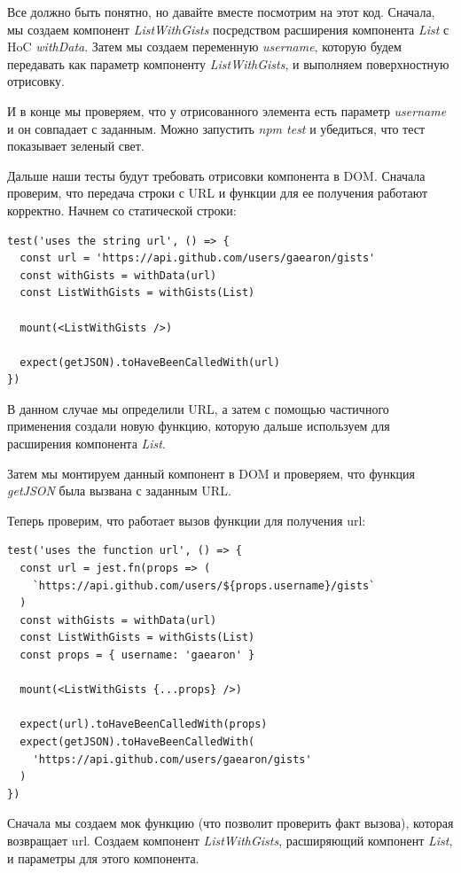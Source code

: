 Все должно быть понятно, но давайте вместе посмотрим на этот код. 
Сначала, мы создаем компонент \textit{ListWithGists} посредством расширения компонента \textit{List} с HoC \textit{withData}. Затем мы создаем переменную \textit{username}, которую будем передавать как параметр компоненту \textit{ListWithGists}, и выполняем поверхностную отрисовку. 

И в конце мы проверяем, что у отрисованного элемента есть параметр \textit{username} и он совпадает с заданным. Можно запустить \textit{npm test} и убедиться, что тест показывает зеленый свет.

Дальше наши тесты будут требовать отрисовки компонента в DOM. 
Сначала проверим, что передача строки с URL и функции для ее получения работают корректно. Начнем со статической строки:

\begin{lstlisting}
test('uses the string url', () => {
  const url = 'https://api.github.com/users/gaearon/gists'
  const withGists = withData(url)
  const ListWithGists = withGists(List)
  
  mount(<ListWithGists />)
  
  expect(getJSON).toHaveBeenCalledWith(url)
})	
\end{lstlisting}

В данном случае мы определили URL, а затем с помощью частичного применения создали новую функцию, которую дальше используем для расширения компонента \textit{List}.

Затем мы монтируем данный компонент в DOM и проверяем, что функция \textit{getJSON} была вызвана с заданным URL. 

Теперь проверим, что работает вызов функции для получения url:

\begin{lstlisting}
test('uses the function url', () => {
  const url = jest.fn(props => (
    `https://api.github.com/users/${props.username}/gists`
  )
  const withGists = withData(url)
  const ListWithGists = withGists(List)
  const props = { username: 'gaearon' }
  
  mount(<ListWithGists {...props} />)
  
  expect(url).toHaveBeenCalledWith(props)
  expect(getJSON).toHaveBeenCalledWith(
    'https://api.github.com/users/gaearon/gists'
  )
})
\end{lstlisting}

Сначала мы создаем мок функцию (что позволит проверить факт вызова), которая возвращает url. Создаем компонент \textit{ListWithGists}, расширяющий компонент \textit{List}, и параметры для этого компонента. 

